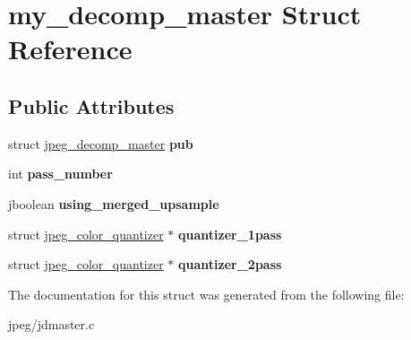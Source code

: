 \hypertarget{structmy__decomp__master}{}\section{my\+\_\+decomp\+\_\+master Struct Reference}
\label{structmy__decomp__master}
\subsection*{Public Attributes}
\begin{DoxyCompactItemize}
\item 
struct \hyperlink{structjpeg__decomp__master}{jpeg\+\_\+decomp\+\_\+master} {\bfseries pub}\hypertarget{structmy__decomp__master_ab9a692c30b5f1cc03d9074ad3c69af3f}{}\label{structmy__decomp__master_ab9a692c30b5f1cc03d9074ad3c69af3f}

\item 
int {\bfseries pass\+\_\+number}\hypertarget{structmy__decomp__master_a0870daa393b92584b4720171586074a1}{}\label{structmy__decomp__master_a0870daa393b92584b4720171586074a1}

\item 
jboolean {\bfseries using\+\_\+merged\+\_\+upsample}\hypertarget{structmy__decomp__master_aad5f866332d4e48758ac2b3d8f50f4a4}{}\label{structmy__decomp__master_aad5f866332d4e48758ac2b3d8f50f4a4}

\item 
struct \hyperlink{structjpeg__color__quantizer}{jpeg\+\_\+color\+\_\+quantizer} $\ast$ {\bfseries quantizer\+\_\+1pass}\hypertarget{structmy__decomp__master_af72048ba84933f931c09153470ff4f0b}{}\label{structmy__decomp__master_af72048ba84933f931c09153470ff4f0b}

\item 
struct \hyperlink{structjpeg__color__quantizer}{jpeg\+\_\+color\+\_\+quantizer} $\ast$ {\bfseries quantizer\+\_\+2pass}\hypertarget{structmy__decomp__master_a9a5f56ccbaec7d13e08e0cfb9d7a3974}{}\label{structmy__decomp__master_a9a5f56ccbaec7d13e08e0cfb9d7a3974}

\end{DoxyCompactItemize}


The documentation for this struct was generated from the following file\+:\begin{DoxyCompactItemize}
\item 
jpeg/jdmaster.\+c\end{DoxyCompactItemize}
